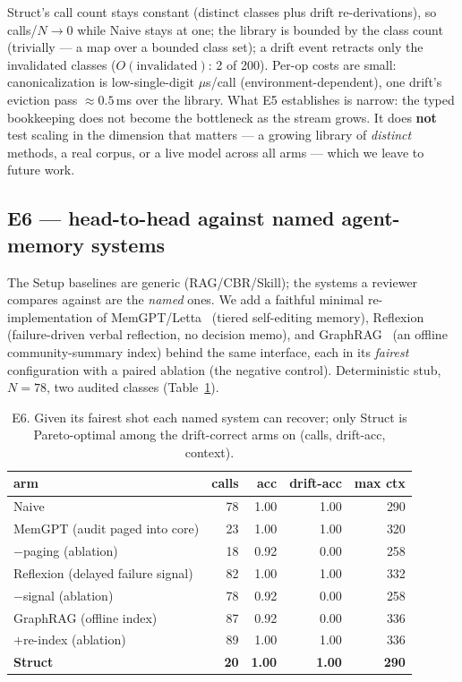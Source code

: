 \documentclass[11pt]{article}
\begin{document}
Struct's call count stays constant (distinct classes plus drift re-derivations), so calls/$N\to0$ while Naive stays
at one; the library is bounded by the class count (trivially --- a map over a bounded class set); a drift event
retracts only the invalidated classes ($O(\text{invalidated})$: 2 of 200). Per-op costs are small:
canonicalization is low-single-digit $\mu$s/call (environment-dependent), one drift's eviction pass
$\approx0.5$\,ms over the library. What E5 establishes is narrow: the
typed bookkeeping does not become the bottleneck as the stream grows. It does \textbf{not} test scaling in the
dimension that matters --- a growing library of \emph{distinct} methods, a real corpus, or a live model across all
arms --- which we leave to future work.

\subsection{E6 --- head-to-head against named agent-memory systems}\label{sec:e6}
The Setup baselines are generic (RAG/CBR/Skill); the systems a reviewer compares against are the \emph{named}
ones. We add a faithful minimal re-implementation of MemGPT/Letta~\cite{packer2023} (tiered self-editing memory),
Reflexion~\cite{shinn2023} (failure-driven verbal reflection, no decision memo), and GraphRAG~\cite{edge2024} (an
offline community-summary index) behind the same interface, each in its \emph{fairest} configuration with a paired
ablation (the negative control). Deterministic stub, $N=78$, two audited classes (Table~\ref{tab:e6}).

\begin{table}[h]\centering
\begin{tabular}{lrrrr}
\toprule
arm & calls & acc & drift-acc & max ctx \\
\midrule
Naive & 78 & 1.00 & 1.00 & 290 \\
MemGPT (audit paged into core) & 23 & 1.00 & 1.00 & 320 \\
\quad $-$paging (ablation) & 18 & 0.92 & 0.00 & 258 \\
Reflexion (delayed failure signal) & 82 & 1.00 & 1.00 & 332 \\
\quad $-$signal (ablation) & 78 & 0.92 & 0.00 & 258 \\
GraphRAG (offline index) & 87 & 0.92 & 0.00 & 336 \\
\quad $+$re-index (ablation) & 89 & 1.00 & 1.00 & 336 \\
\textbf{Struct} & \textbf{20} & \textbf{1.00} & \textbf{1.00} & \textbf{290} \\
\bottomrule
\end{tabular}
\caption{E6. Given its fairest shot each named system can recover; only Struct is Pareto-optimal among the drift-correct arms on (calls, drift-acc, context).}
\label{tab:e6}
\end{table}
\end{document}
